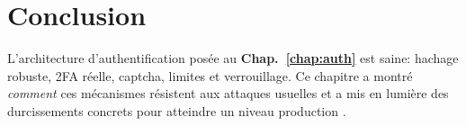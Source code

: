 \section{Conclusion}
\noindent L'architecture d'authentification posée au \textbf{Chap.~\ref{chap:auth}} est saine: hachage robuste, 2FA réelle, captcha, limites et verrouillage. Ce chapitre a montré \emph{comment} ces mécanismes résistent aux attaques usuelles et a mis en lumière des durcissements concrets pour atteindre un niveau \og production \fg{}.


